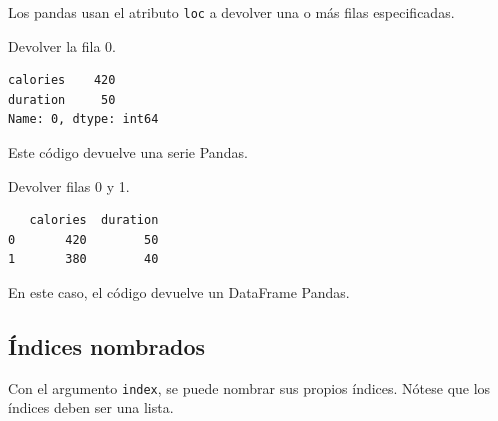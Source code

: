 Los pandas usan el atributo \texttt{loc} a devolver una o más filas
especificadas. \\

\begin{code} Devolver la fila 0.

\begin{Shaded}
\begin{Highlighting}[]
\NormalTok{(df.loc[}\NormalTok{])}
\end{Highlighting}
\end{Shaded}

\begin{verbatim}
calories    420
duration     50
Name: 0, dtype: int64
\end{verbatim}
\end{code}

Este código devuelve una serie Pandas.\\

\begin{code} Devolver filas 0 y 1.

\begin{Shaded}
\begin{Highlighting}[]
\NormalTok{(df.loc[[}\NormalTok{, }\NormalTok{]])}
\end{Highlighting}
\end{Shaded}

\begin{verbatim}
   calories  duration
0       420        50
1       380        40
\end{verbatim}
\end{code}

En este caso, el código devuelve un DataFrame Pandas.

\subsection{Índices nombrados}

Con el argumento \texttt{index}, se puede nombrar sus propios índices.
Nótese que los índices deben ser una lista.\\

